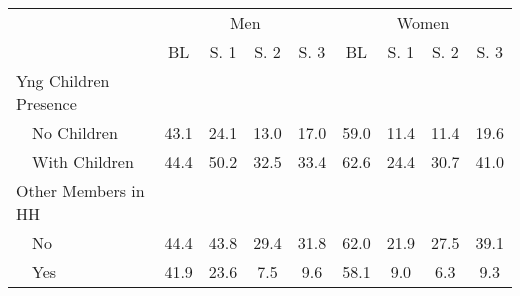\begin{tabular}{l*{8}{c}}
\hline\hline
          & \multicolumn{4}{c}{Men} & \multicolumn{4}{c}{Women} \\  \cline{2-5} \cline{6-9}
            &    BL&  S. 1&  S. 2&  S. 3&    BL&  S. 1&  S. 2&  S. 3\\
Yng Children Presence & \multicolumn{8}{c}{} \\ 
\ \ No Children&        43.1&        24.1&        13.0&        17.0&        59.0&        11.4&        11.4&        19.6\\
\ \ With Children&        44.4&        50.2&        32.5&        33.4&        62.6&        24.4&        30.7&        41.0\\
\midrule

Other Members in HH    & \multicolumn{8}{c}{} \\ 
\ \ No      &        44.4&        43.8&        29.4&        31.8&        62.0&        21.9&        27.5&        39.1\\
\ \ Yes     &        41.9&        23.6&         7.5&         9.6&        58.1&         9.0&         6.3&         9.3\\
\hline\hline
\end{tabular}
